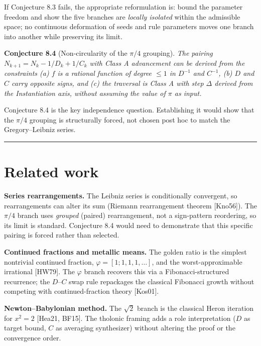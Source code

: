 \documentclass[12pt]{article}
\begin{document}
If Conjecture 8.3 fails, the appropriate reformulation is: bound the
parameter freedom and show the five branches are \emph{locally isolated}
within the admissible space; no continuous deformation of seeds and rule
parameters moves one branch into another while preserving its limit.

\textbf{Conjecture 8.4} (Non-circularity of the \(\pi/4\) grouping).
\emph{The pairing \(N_{k+1} = N_k - 1/D_k + 1/C_k\) with Class A
advancement can be derived from the constraints (a) \(f\) is a rational
function of degree \(\leq 1\) in \(D^{-1}\) and \(C^{-1}\), (b) \(D\)
and \(C\) carry opposite signs, and (c) the traversal is Class A with
step \(\Delta\) derived from the Instantiation axis, without assuming
the value of \(\pi\) as input.}

Conjecture 8.4 is the key independence question. Establishing it would
show that the \(\pi/4\) grouping is structurally forced, not chosen post
hoc to match the Gregory--Leibniz series.

\begin{center}\rule{0.5\linewidth}{0.5pt}\end{center}

\section{Related work}\label{related-work}

\textbf{Series rearrangements.} The Leibniz series is conditionally
convergent, so rearrangements can alter its sum (Riemann rearrangement
theorem {[}Kno56{]}). The \(\pi/4\) branch uses \emph{grouped} (paired)
rearrangement, not a sign-pattern reordering, so its limit is standard.
Conjecture 8.4 would need to demonstrate that this specific pairing is
forced rather than selected.

\textbf{Continued fractions and metallic means.} The golden ratio is the
simplest nontrivial continued fraction, \(\varphi = [1;1,1,1,\ldots]\),
and the worst-approximable irrational {[}HW79{]}. The \(\varphi\) branch
recovers this via a Fibonacci-structured recurrence; the \(D\)--\(C\)
swap rule repackages the classical Fibonacci growth without competing
with continued-fraction theory {[}Kos01{]}.

\textbf{Newton--Babylonian method.} The \(\sqrt{2}\) branch is the
classical Heron iteration for \(x^2 = 2\) {[}Hea21, BF15{]}. The
tholonic framing adds a role interpretation (\(D\) as target bound,
\(C\) as averaging synthesizer) without altering the proof or the
convergence order.
\end{document}
